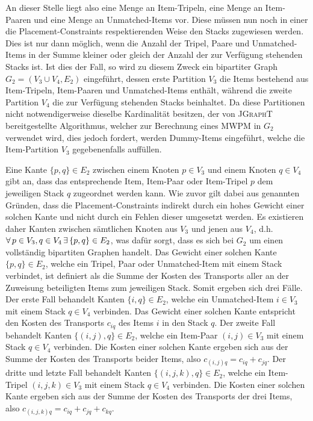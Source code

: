 An dieser Stelle liegt also eine Menge an Item-Tripeln, eine Menge an Item-Paaren und eine Menge an Unmatched-Items vor. Diese müssen nun
noch in einer die Placement-Constraints respektierenden Weise den Stacks zugewiesen werden.
Dies ist nur dann möglich, wenn die Anzahl der Tripel, Paare und Unmatched-Items in der Summe kleiner oder gleich der Anzahl
der zur Verfügung stehenden Stacks ist.
Ist dies der Fall, so wird zu diesem Zweck ein bipartiter Graph $G_2 = (V_3 \cup V_4, E_2)$ eingeführt,
dessen erste Partition $V_3$ die Items bestehend aus Item-Tripeln, Item-Paaren und Unmatched-Items enthält,
während die zweite Partition $V_4$ die zur Verfügung stehenden Stacks beinhaltet. Da diese Partitionen nicht notwendigerweise dieselbe Kardinalität besitzen, der von \textsc{JGraphT} bereitgestellte Algorithmus, welcher zur Berechnung eines
\textsc{MWPM} in $G_2$ verwendet wird, dies jedoch fordert, werden Dummy-Items eingeführt, welche die
Item-Partition $V_3$ gegebenenfalls auffüllen.

Eine Kante $\{p, q\} \in E_2$ zwischen einem Knoten $p \in V_3$ und einem Knoten $q \in V_4$ gibt an, dass das entsprechende Item, Item-Paar oder Item-Tripel $p$ dem jeweiligen Stack $q$ zugeordnet werden kann. Wie zuvor gilt dabei
aus genannten Gründen, dass die Placement-Constraints indirekt durch ein hohes Gewicht einer solchen Kante und
nicht durch ein Fehlen dieser umgesetzt werden. Es existieren daher Kanten zwischen sämtlichen Knoten aus $V_3$ und
jenen aus $V_4$, d.h. $\forall \thinspace p \in V_3, q \in V_4 \thinspace \exists \thinspace \{p, q\} \in E_2$, was dafür sorgt,
dass es sich bei $G_2$ um einen vollständig bipartiten Graphen handelt.
Das Gewicht einer solchen Kante $\{p, q\} \in E_2$, welche ein Tripel, Paar oder Unmatched-Item mit einem Stack
verbindet, ist definiert als die Summe der Kosten des Transports aller an der Zuweisung beteiligten Items zum
jeweiligen Stack. Somit ergeben sich drei Fälle.
Der erste Fall behandelt Kanten $\{i, q\} \in E_2$, welche ein Unmatched-Item $i \in V_3$ mit einem Stack $q \in V_4$ verbinden.
Das Gewicht einer solchen Kante entspricht den Kosten des Transports $c_{iq}$ des Items $i$ in den Stack $q$.
Der zweite Fall behandelt Kanten $\{(i, j), q\} \in E_2$, welche ein Item-Paar $(i, j) \in V_3$ mit einem Stack $q \in V_4$
verbinden. Die Kosten einer solchen Kante ergeben sich aus der Summe der Kosten des Transports beider Items,
also $c_{(i, j)q} = c_{iq} + c_{jq}$.
Der dritte und letzte Fall behandelt Kanten $\{(i, j, k), q\} \in E_2$, welche ein Item-Tripel $(i, j, k) \in V_3$
mit einem Stack $q \in V_4$ verbinden. Die Kosten einer solchen Kante ergeben sich aus der Summe der Kosten des Transports
der drei Items, also $c_{(i, j, k)q} = c_{iq} + c_{jq} + c_{kq}$.

